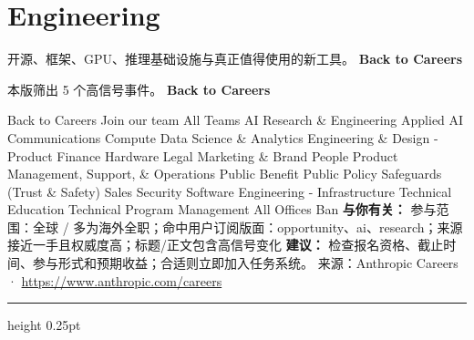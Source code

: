 \documentclass[10.5pt]{ctexart}
\begin{document}
\section*{Engineering}
{\color{ormuted} 开源、框架、GPU、推理基础设施与真正值得使用的新工具。}
\vspace{2mm}
{\LARGE\bfseries Back to Careers}\par
\vspace{1mm}
{\color{ormuted} 本版筛出 5 个高信号事件。}
\vspace{3mm}
{\Large\bfseries Back to Careers}\par
Back to Careers Join our team All Teams AI Research \& Engineering Applied AI Communications Compute Data Science \& Analytics Engineering \& Design - Product Finance Hardware Legal Marketing \& Brand People Product Management, Support, \& Operations Public Benefit Public Policy Safeguards (Trust \& Safety) Sales Security Software Engineering - Infrastructure Technical Education Technical Program Management All Offices Ban
\textbf{与你有关：} 参与范围：全球 / 多为海外全职；命中用户订阅版面：opportunity、ai、research；来源接近一手且权威度高；标题/正文包含高信号变化
\textbf{建议：} 检查报名资格、截止时间、参与形式和预期收益；合适则立即加入任务系统。
{\footnotesize\color{ormuted} 来源：Anthropic Careers · \url{https://www.anthropic.com/careers}}
\vspace{4mm}
\hrule height 0.25pt
\vspace{3mm}
\end{document}
